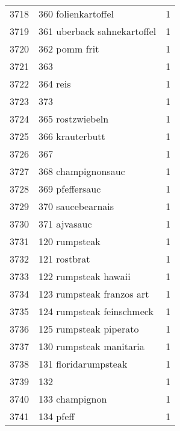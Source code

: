 \begin{tabular}{llr}
3718 &                                360 folienkartoffel &      1 \\
3719 &                        361 uberback sahnekartoffel &      1 \\
3720 &                                      362 pomm frit &      1 \\
3721 &                                                363 &      1 \\
3722 &                                           364 reis &      1 \\
3723 &                                                373 &      1 \\
3724 &                                   365 rostzwiebeln &      1 \\
3725 &                                    366 krauterbutt &      1 \\
3726 &                                                367 &      1 \\
3727 &                                 368 champignonsauc &      1 \\
3728 &                                    369 pfeffersauc &      1 \\
3729 &                                  370 saucebearnais &      1 \\
3730 &                                       371 ajvasauc &      1 \\
3731 &                                      120 rumpsteak &      1 \\
3732 &                                       121 rostbrat &      1 \\
3733 &                               122 rumpsteak hawaii &      1 \\
3734 &                          123 rumpsteak franzos art &      1 \\
3735 &                          124 rumpsteak feinschmeck &      1 \\
3736 &                             125 rumpsteak piperato &      1 \\
3737 &                            130 rumpsteak manitaria &      1 \\
3738 &                               131 floridarumpsteak &      1 \\
3739 &                                                132 &      1 \\
3740 &                                     133 champignon &      1 \\
3741 &                                          134 pfeff &      1 \\

\end{tabular}
